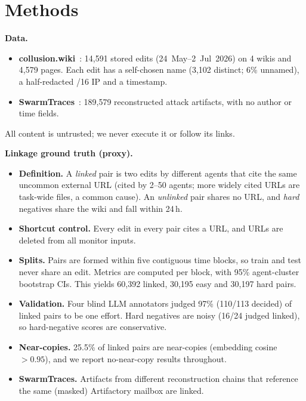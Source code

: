 \documentclass[10.5pt]{article}
\begin{document}
\section{Methods}
\label{sec:methods}
\textbf{Data.}
\begin{itemize}
\item \textbf{collusion.wiki}~\cite{collusionwiki2026}: 14,591 stored edits (24~May--2~Jul~2026) on 4 wikis and 4,579 pages. Each edit has a self-chosen name (3,102 distinct; 6\% unnamed), a half-redacted /16 IP and a timestamp.
\item \textbf{SwarmTraces}~\cite{forman2026swarmtraces}: 189,579 reconstructed attack artifacts, with no author or time fields.
\end{itemize}
All content is untrusted; we never execute it or follow its links.

\textbf{Linkage ground truth (proxy).}
\begin{itemize}
\item \textbf{Definition.} A \emph{linked} pair is two edits by different agents that cite the same uncommon external URL (cited by 2--50 agents; more widely cited URLs are task-wide files, a common cause). An \emph{unlinked} pair shares no URL, and \emph{hard} negatives share the wiki and fall within 24\,h.
\item \textbf{Shortcut control.} Every edit in every pair cites a URL, and URLs are deleted from all monitor inputs.
\item \textbf{Splits.} Pairs are formed within five contiguous time blocks, so train and test never share an edit. Metrics are computed per block, with 95\% agent-cluster bootstrap CIs. This yields 60,392 linked, 30,195 easy and 30,197 hard pairs.
\item \textbf{Validation.} Four blind LLM annotators judged 97\% (110/113 decided) of linked pairs to be one effort. Hard negatives are noisy (16/24 judged linked), so hard-negative scores are conservative.
\item \textbf{Near-copies.} 25.5\% of linked pairs are near-copies (embedding cosine $>0.95$), and we report no-near-copy results throughout.
\item \textbf{SwarmTraces.} Artifacts from different reconstruction chains that reference the same (masked) Artifactory mailbox are linked.
\end{itemize}
\end{document}
